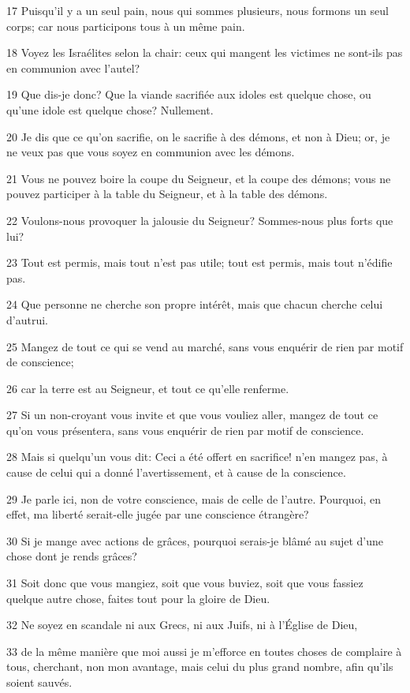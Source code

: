 \par 17 Puisqu'il y a un seul pain, nous qui sommes plusieurs, nous formons un seul corps; car nous participons tous à un même pain.
\par 18 Voyez les Israélites selon la chair: ceux qui mangent les victimes ne sont-ils pas en communion avec l'autel?
\par 19 Que dis-je donc? Que la viande sacrifiée aux idoles est quelque chose, ou qu'une idole est quelque chose? Nullement.
\par 20 Je dis que ce qu'on sacrifie, on le sacrifie à des démons, et non à Dieu; or, je ne veux pas que vous soyez en communion avec les démons.
\par 21 Vous ne pouvez boire la coupe du Seigneur, et la coupe des démons; vous ne pouvez participer à la table du Seigneur, et à la table des démons.
\par 22 Voulons-nous provoquer la jalousie du Seigneur? Sommes-nous plus forts que lui?
\par 23 Tout est permis, mais tout n'est pas utile; tout est permis, mais tout n'édifie pas.
\par 24 Que personne ne cherche son propre intérêt, mais que chacun cherche celui d'autrui.
\par 25 Mangez de tout ce qui se vend au marché, sans vous enquérir de rien par motif de conscience;
\par 26 car la terre est au Seigneur, et tout ce qu'elle renferme.
\par 27 Si un non-croyant vous invite et que vous vouliez aller, mangez de tout ce qu'on vous présentera, sans vous enquérir de rien par motif de conscience.
\par 28 Mais si quelqu'un vous dit: Ceci a été offert en sacrifice! n'en mangez pas, à cause de celui qui a donné l'avertissement, et à cause de la conscience.
\par 29 Je parle ici, non de votre conscience, mais de celle de l'autre. Pourquoi, en effet, ma liberté serait-elle jugée par une conscience étrangère?
\par 30 Si je mange avec actions de grâces, pourquoi serais-je blâmé au sujet d'une chose dont je rends grâces?
\par 31 Soit donc que vous mangiez, soit que vous buviez, soit que vous fassiez quelque autre chose, faites tout pour la gloire de Dieu.
\par 32 Ne soyez en scandale ni aux Grecs, ni aux Juifs, ni à l'Église de Dieu,
\par 33 de la même manière que moi aussi je m'efforce en toutes choses de complaire à tous, cherchant, non mon avantage, mais celui du plus grand nombre, afin qu'ils soient sauvés.

